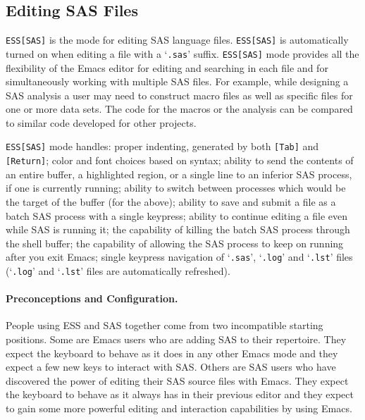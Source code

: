 \documentclass{article}
\newcommand{\stexttt}[1]{{\small\texttt{#1}}}
\newcommand{\file}[1]{`\stexttt{#1}'}
\begin{document}
\subsection{Editing SAS Files}
\label{sec:SAS:edit}

\stexttt{ESS[SAS]} is the mode for editing SAS language files.
\stexttt{ESS[SAS]} is automatically turned on when editing a file with
a \file{.sas} suffix.  \stexttt{ESS[SAS]} mode provides all the
flexibility of the Emacs editor for editing and searching in each file
and for simultaneously working with multiple SAS files.  For example,
while designing a SAS analysis a user may need to construct macro
files as well as specific files for one or more data sets.  The code
for the macros or the analysis can be compared to similar code
developed for other projects.

\stexttt{ESS[SAS]} mode handles: proper indenting, generated by both
\stexttt{[Tab]} and \stexttt{[Return]}; color and font choices based
on syntax; ability to send the contents of an entire buffer, a
highlighted region, or a single line to an inferior SAS process, if
one is currently running; ability to switch between processes which
would be the target of the buffer (for the above); ability to save and
submit a file as a batch SAS process with a single keypress; ability
to continue editing a file even while SAS is running it; the
capability of killing the batch SAS process through the shell buffer;
the capability of allowing the SAS process to keep on running after
you exit Emacs; single keypress navigation of \file{.sas}, \file{.log}
and \file{.lst} files (\file{.log} and \file{.lst} files are
automatically refreshed).


\paragraph{Preconceptions and Configuration.}

People using ESS and SAS together come from two incompatible starting
positions.  Some are Emacs users who are adding SAS to their
repertoire.  They expect the keyboard to behave as it does in any
other Emacs mode and they expect a few new keys to interact with SAS.
Others are SAS users who have discovered the power of editing their
SAS source files with Emacs.  They expect the keyboard to behave as it
always has in their previous editor and they expect to gain some more
powerful editing and interaction capabilities by using Emacs.
\end{document}
